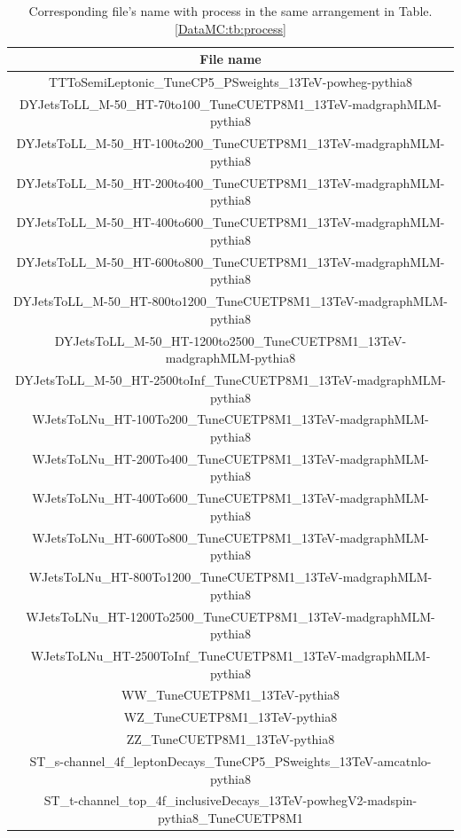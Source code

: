 		\begin{center}
		\begin{longtable}{ | c | }
		\caption{Corresponding file's name with process in the same arrangement in Table.\ref{DataMC:tb:process}} \\
		\hline
		File name \\ 
		\hline
		TTToSemiLeptonic\_TuneCP5\_PSweights\_13TeV-powheg-pythia8 \\
		\hline
		DYJetsToLL\_M-50\_HT-70to100\_TuneCUETP8M1\_13TeV-madgraphMLM-pythia8 \\
		DYJetsToLL\_M-50\_HT-100to200\_TuneCUETP8M1\_13TeV-madgraphMLM-pythia8 \\
		DYJetsToLL\_M-50\_HT-200to400\_TuneCUETP8M1\_13TeV-madgraphMLM-pythia8 \\
		DYJetsToLL\_M-50\_HT-400to600\_TuneCUETP8M1\_13TeV-madgraphMLM-pythia8 \\
		DYJetsToLL\_M-50\_HT-600to800\_TuneCUETP8M1\_13TeV-madgraphMLM-pythia8 \\
		DYJetsToLL\_M-50\_HT-800to1200\_TuneCUETP8M1\_13TeV-madgraphMLM-pythia8 \\
		DYJetsToLL\_M-50\_HT-1200to2500\_TuneCUETP8M1\_13TeV-madgraphMLM-pythia8 \\
		DYJetsToLL\_M-50\_HT-2500toInf\_TuneCUETP8M1\_13TeV-madgraphMLM-pythia8 \\
		\hline
		WJetsToLNu\_HT-100To200\_TuneCUETP8M1\_13TeV-madgraphMLM-pythia8 \\
		WJetsToLNu\_HT-200To400\_TuneCUETP8M1\_13TeV-madgraphMLM-pythia8 \\
		WJetsToLNu\_HT-400To600\_TuneCUETP8M1\_13TeV-madgraphMLM-pythia8 \\
		WJetsToLNu\_HT-600To800\_TuneCUETP8M1\_13TeV-madgraphMLM-pythia8 \\
		WJetsToLNu\_HT-800To1200\_TuneCUETP8M1\_13TeV-madgraphMLM-pythia8 \\
		WJetsToLNu\_HT-1200To2500\_TuneCUETP8M1\_13TeV-madgraphMLM-pythia8 \\
		WJetsToLNu\_HT-2500ToInf\_TuneCUETP8M1\_13TeV-madgraphMLM-pythia8 \\
		\hline
		WW\_TuneCUETP8M1\_13TeV-pythia8 \\
		WZ\_TuneCUETP8M1\_13TeV-pythia8 \\
		ZZ\_TuneCUETP8M1\_13TeV-pythia8 \\
		\hline
		ST\_s-channel\_4f\_leptonDecays\_TuneCP5\_PSweights\_13TeV-amcatnlo-pythia8 \\
		ST\_t-channel\_top\_4f\_inclusiveDecays\_13TeV-powhegV2-madspin-pythia8\_TuneCUETP8M1 \\

\end{longtable}
\end{center}

